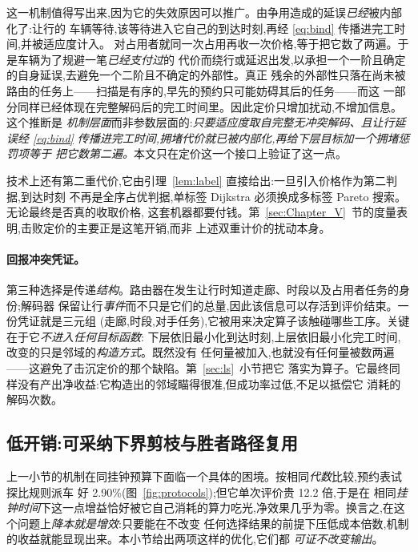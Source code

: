 \documentclass[manuscript,screen,review]{acmart}
\newcommand{\CostMultBefore}{12.2}
\newcommand{\GainProbeSameGen}{2.90\%}
\begin{document}
这一机制值得写出来,因为它的失效原因可以推广。由争用造成的延误\emph{已经}被内部化了:让行的
车辆等待,该等待进入它自己的到达时刻,再经 \eqref{eq:bind} 传播进完工时间,并被适应度计入。
对占用者就同一次占用再收一次价格,等于把它数了两遍。于是车辆为了规避一笔\emph{已经支付过}的
代价而绕行或延迟出发,以承担一个一阶且确定的自身延误,去避免一个二阶且不确定的外部性。真正
残余的外部性只落在尚未被路由的任务上——扫描是有序的,早先的预约只可能妨碍其后的任务——而这
一部分同样已经体现在完整解码后的完工时间里。因此定价只增加扰动,不增加信息。这个推断是
\emph{机制层面}而非参数层面的:\emph{只要适应度取自完整无冲突解码、且让行延误经
\eqref{eq:bind} 传播进完工时间,拥堵代价就已被内部化,再给下层目标加一个拥堵惩罚项等于
把它数第二遍。}本文只在定价这一个接口上验证了这一点。

技术上还有第二重代价,它由引理~\ref{lem:label} 直接给出:一旦引入价格作为第二判据,到达时刻
不再是全序占优判据,单标签 Dijkstra 必须换成多标签 Pareto 搜索。无论最终是否真的收取价格,
这套机器都要付钱。第~\ref{sec:Chapter_V}~节的度量表明,击败定价的主要正是这笔开销,而非
上述双重计价的扰动本身。

\paragraph{回报冲突凭证。}
第三种选择是传递\emph{结构}。路由器在发生让行时知道走廊、时段以及占用者任务的身份;解码器
保留让行\emph{事件}而不只是它们的总量,因此该信息可以存活到评价结束。一份凭证就是三元组
(走廊,时段,对手任务),它被用来决定算子该触碰哪些工序。关键在于它\emph{不进入任何目标函数}:
下层依旧最小化到达时刻,上层依旧最小化完工时间,改变的只是邻域的\emph{构造方式}。既然没有
任何量被加入,也就没有任何量被数两遍——这避免了击沉定价的那个缺陷。第~\ref{sec:ls}~小节把它
落实为算子。它最终同样没有产出净收益:它构造出的邻域瞄得很准,但成功率过低,不足以抵偿它
消耗的解码次数。

\subsection{低开销:可采纳下界剪枝与胜者路径复用}
\label{sec:speedup}

上一小节的机制在同挂钟预算下面临一个具体的困境。按相同\emph{代数}比较,预约表试探比规则派车
好 \GainProbeSameGen{}(图~\ref{fig:protocols});但它单次评价贵 \CostMultBefore{} 倍,于是在
相同\emph{挂钟时间}下这一点增益恰好被它自己消耗的算力吃光,净效果几乎为零。换言之,在这个问题上\emph{降本就是增效}:只要能在不改变
任何选择结果的前提下压低成本倍数,机制的收益就能显现出来。本小节给出两项这样的优化,它们都
\emph{可证不改变输出}。
\end{document}
